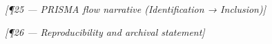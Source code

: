 
\bigskip\noindent\textit{[¶25 — PRISMA flow narrative (Identification → Inclusion)]}


\bigskip\noindent\textit{[¶26 — Reproducibility and archival statement]}


